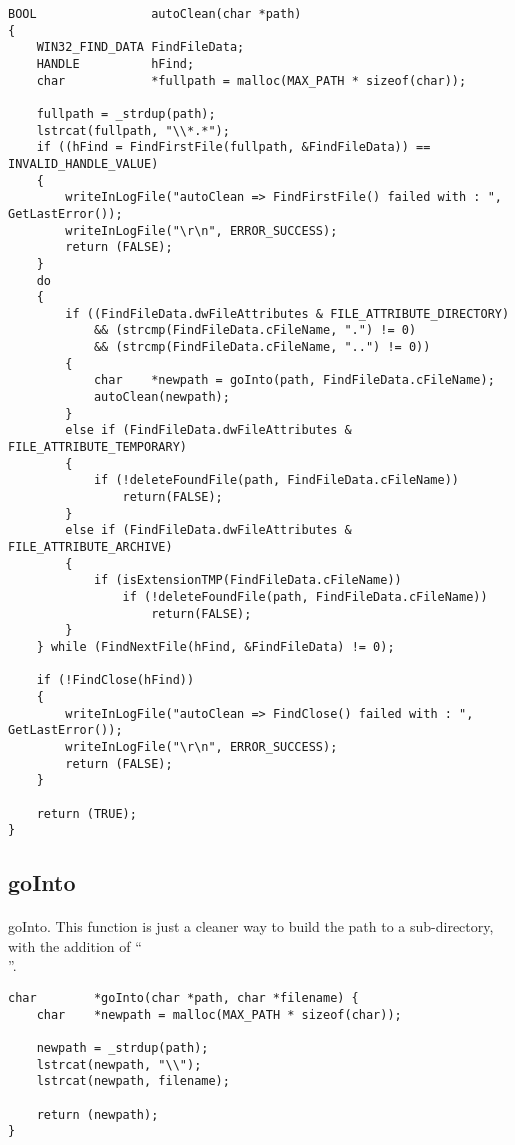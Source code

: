 \documentclass{article}
\begin{document}
\begin{lstlisting}
BOOL				autoClean(char *path)
{
	WIN32_FIND_DATA	FindFileData;
	HANDLE			hFind;
	char			*fullpath = malloc(MAX_PATH * sizeof(char));

	fullpath = _strdup(path);
	lstrcat(fullpath, "\\*.*");
	if ((hFind = FindFirstFile(fullpath, &FindFileData)) == INVALID_HANDLE_VALUE)
	{
		writeInLogFile("autoClean => FindFirstFile() failed with : ", GetLastError());
		writeInLogFile("\r\n", ERROR_SUCCESS);
		return (FALSE);
	}
	do
	{
		if ((FindFileData.dwFileAttributes & FILE_ATTRIBUTE_DIRECTORY)
			&& (strcmp(FindFileData.cFileName, ".") != 0)
			&& (strcmp(FindFileData.cFileName, "..") != 0))
		{
			char	*newpath = goInto(path, FindFileData.cFileName);
			autoClean(newpath);
		}
		else if (FindFileData.dwFileAttributes & FILE_ATTRIBUTE_TEMPORARY)
		{
			if (!deleteFoundFile(path, FindFileData.cFileName))
				return(FALSE);
		}
		else if (FindFileData.dwFileAttributes & FILE_ATTRIBUTE_ARCHIVE)
		{
			if (isExtensionTMP(FindFileData.cFileName))
				if (!deleteFoundFile(path, FindFileData.cFileName))
					return(FALSE);
		}
	} while (FindNextFile(hFind, &FindFileData) != 0);

	if (!FindClose(hFind))
	{
		writeInLogFile("autoClean => FindClose() failed with : ", GetLastError());
		writeInLogFile("\r\n", ERROR_SUCCESS);
		return (FALSE);
	}

	return (TRUE);
}
\end{lstlisting}

\newpage
\subsection{goInto}
\paragraph{}
goInto. This function is just a cleaner way to build the path to a sub-directory, with the addition of ``\\''.

\begin{lstlisting}
char		*goInto(char *path, char *filename) {
	char	*newpath = malloc(MAX_PATH * sizeof(char));

	newpath = _strdup(path);
	lstrcat(newpath, "\\");
	lstrcat(newpath, filename);

	return (newpath);
}
\end{lstlisting}
\end{document}
